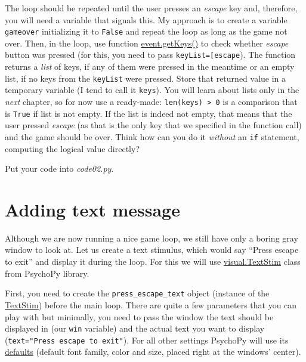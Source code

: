 \documentclass[
]{book}
\begin{document}
The loop should be repeated until the user presses an \emph{escape} key and, therefore, you will need a variable that signals this. My approach is to create a variable \texttt{gameover} initializing it to \texttt{False} and repeat the loop as long as the game not over. Then, in the loop, use function \href{https://psychopy.org/api/event.html\#psychopy.event.getKeys}{event.getKeys()} to check whether \emph{escape} button was pressed (for this, you need to pass \texttt{keyList={[}\textquotesingle{}escape\textquotesingle{}{]}}). The function returns a \emph{list} of keys, if any of them were pressed in the meantime or an empty list, if no keys from the \texttt{keyList} were pressed. Store that returned value in a temporary variable (I tend to call it \texttt{keys}). You will learn about lists only in the \emph{next} chapter, so for now use a ready-made: \texttt{len(keys)\ \textgreater{}\ 0} is a comparison that is \texttt{True} if list is not empty. If the list is indeed not empty, that means that the user pressed \emph{escape} (as that is the only key that we specified in the function call) and the game should be over. Think how can you do it \emph{without} an \texttt{if} statement, computing the logical value directly?

Put your code into \emph{code02.py}.

\hypertarget{adding-text-message}{%
\section{Adding text message}\label{adding-text-message}}

Although we are now running a nice game loop, we still have only a boring gray window to look at. Let us create a text stimulus, which would say ``Press escape to exit'' and display it during the loop. For this we will use \href{https://psychopy.org/api/visual/textstim.html}{visual.TextStim} class from PsychoPy library.

First, you need to create the \texttt{press\_escape\_text} object (instance of the \href{https://psychopy.org/api/visual/textstim.html\%20class}{TextStim}) before the main loop. There are quite a few parameters that you can play with but minimally, you need to pass the window the text should be displayed in (our \texttt{win} variable) and the actual text you want to display (\texttt{text="Press\ escape\ to\ exit"}). For all other settings PsychoPy will use its \protect\hyperlink{arguments-by-position-or-name}{defaults} (default font family, color and size, placed right at the windows' center).
\end{document}
